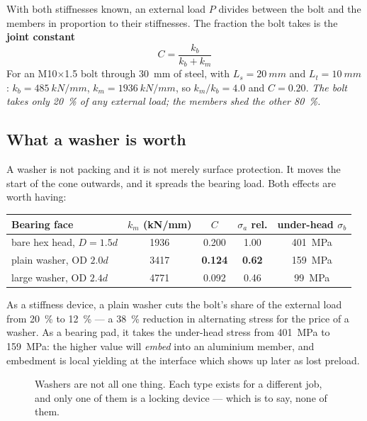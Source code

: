 \documentclass[11pt,a4paper]{article}
\begin{document}
With both stiffnesses known, an external load $P$ divides between the bolt and the members in
proportion to their stiffnesses. The fraction the bolt takes is the \textbf{joint constant}
\[
\boxed{\;C=\frac{k_b}{k_b+k_m}\;}
\]
For an M10$\times$1.5 bolt through \SI{30}{mm} of steel, with $L_s=\SI{20}{mm}$ and
$L_t=\SI{10}{mm}$: $k_b=\SI{485}{kN/mm}$, $k_m=\SI{1936}{kN/mm}$, so $k_m/k_b=4.0$ and
$C=\mathbf{0.20}$. \emph{The bolt takes only \SI{20}{\percent} of any external load; the members shed
the other \SI{80}{\percent}.}

\subsection{What a washer is worth}\label{sec:washers}

A washer is not packing and it is not merely surface protection. It moves the start of the cone
outwards, and it spreads the bearing load. Both effects are worth having:

\begin{center}\small
\begin{tabular}{@{}lcccc@{}}
\toprule
Bearing face & $k_m$ (\si{kN/mm}) & $C$ & $\sigma_a$ rel. & under-head $\sigma_b$\\
\midrule
bare hex head, $D=1.5d$ & 1936 & 0.200 & 1.00 & \SI{401}{MPa}\\
plain washer, OD $2.0d$ & 3417 & \textbf{0.124} & \textbf{0.62} & \SI{159}{MPa}\\
large washer, OD $2.4d$ & 4771 & 0.092 & 0.46 & \SI{99}{MPa}\\
\bottomrule
\end{tabular}
\end{center}

\medskip
As a stiffness device, a plain washer cuts the bolt's share of the external load from \SI{20}{\percent}
to \SI{12}{\percent} --- a \SI{38}{\percent} reduction in alternating stress for the price of a washer.
As a bearing pad, it takes the under-head stress from \SI{401}{MPa} to \SI{159}{MPa}: the higher value
will \emph{embed} into an aluminium member, and embedment is local yielding at the interface which
shows up later as lost preload.

\begin{figure}[H]\centering
\resizebox{\textwidth}{!}{}
\caption{Washers are not all one thing. Each type exists for a different job, and only one of them is
a locking device --- which is to say, none of them.}
\end{figure}
\end{document}
